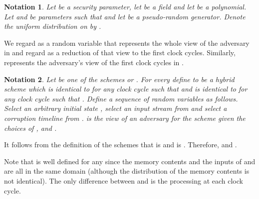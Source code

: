 \documentclass[letterpaper,11pt]{article}
\newtheorem{notation}{Notation}
\begin{document}
\begin{notation}
Let  be a security parameter, let  be a field and let  be a polynomial. Let  and  be parameters such that  and let  be a pseudo-random generator. Denote the uniform distribution on  by . 

\end{notation}

We regard  as a random variable that represents the whole view of the adversary in  and regard  as a reduction of that view to the first  clock cycles. Similarly,  represents the adversary's view of the first  clock cycles in .

\begin{notation}
Let  be one of the schemes  or . For every  define  to be a hybrid scheme which is identical to  for any clock cycle  such that  and is identical to  for any clock cycle  such that . Define a sequence of random variables  as follows. Select an arbitrary initial state , select an input stream  from  and select a corruption timeline  from .  is the view of an adversary for the scheme  given the choices of ,  and .
\end{notation}

It follows from the definition of the schemes  that  is  and  is . Therefore,  and . 

Note that  is well defined for any  since the memory contents and the inputs of  and  are all in the same domain (although the distribution of the memory contents is not identical). The only difference between  and  is the processing at each clock cycle. 
\end{document}
